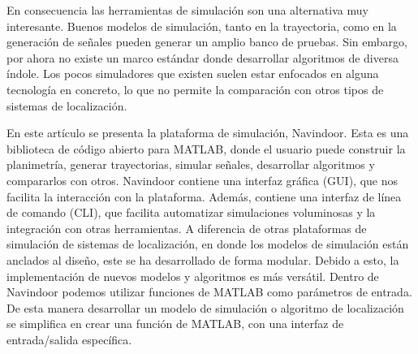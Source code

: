 
En consecuencia las herramientas de simulación son una alternativa muy interesante. Buenos modelos de simulación, tanto en la trayectoria, como en la generación de señales pueden generar un amplio banco de pruebas. Sin embargo, por ahora no existe un marco estándar donde desarrollar algoritmos de diversa índole. Los pocos simuladores que existen suelen estar enfocados en alguna tecnología en concreto, lo que no permite la comparación con otros tipos de sistemas de localización.

 
En este artículo se presenta la plataforma de simulación, Navindoor. Esta es una biblioteca de código abierto para MATLAB, donde el usuario puede construir la planimetría, generar trayectorias, simular señales, desarrollar algoritmos y compararlos con otros. Navindoor contiene una interfaz gráfica (GUI), que nos facilita la interacción con la plataforma. Además, contiene una interfaz de línea de comando (CLI), que facilita automatizar simulaciones voluminosas y la integración con otras herramientas. A diferencia de otras plataformas de simulación de sistemas de localización, en donde los modelos de simulación están anclados al diseño, este se ha desarrollado de forma modular. Debido a esto, la implementación de nuevos modelos y algoritmos es más versátil. Dentro de Navindoor podemos utilizar funciones de MATLAB como parámetros de entrada. De esta manera desarrollar un modelo de simulación o algoritmo de localización se simplifica en crear una función de MATLAB, con una interfaz de entrada/salida específica.




